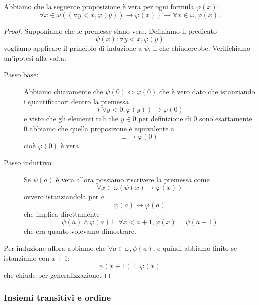 \documentclass[11pt]{scrartcl}
\begin{document}
 	\begin{proposition}
 		Abbiamo che la seguente proposizione è vera per ogni formula $\varphi(x)$:
 		$$\forall x\in \omega\left((\forall y<x,\varphi(y))\to \varphi(x)\right)\to \forall x\in \omega,\varphi(x).$$
 	\end{proposition}
 	\begin{proof}
 		Supponiamo che le premesse siano vere. 
 		Definiamo il predicato
 		$$\psi(x):\forall y< x,\varphi(y)$$
 		vogliamo applicare il principio di induzione a $\psi$, il che chiuderebbe. Verifichiamo un'ipotesi alla volta:
 		\begin{description}
 			\item[Passo base:] Abbiamo chiaramente che $\psi(0)\iff \varphi(0)$ che è vero dato che istanziando i quantificatori dentro la premessa
 			$$(\forall y<0,\varphi(y))\to \varphi(0)$$
 			e visto che gli elementi tali che $y\in 0$ per definizione di $0$ sono esattamente $0$ abbiamo che quella proposizone è equivalente a 
 			$$\bot \to \varphi(0)$$
 			cioè $\varphi(0)$ è vera. 
 			\item[Passo induttivo:] Se $\psi(a)$ è vera allora possiamo riscrivere la premessa come
 			$$\forall x\in \omega\left(\psi(x)\to \varphi(x)\right)$$
 			ovvero istanziandola per $a$ 
 			$$\psi(a)\to \varphi(a)$$
 			che implica direttamente
 			$$\psi(a)\land \varphi(a)\vdash \forall x<a+1,\varphi(x)=\psi(a+1)$$
 			che era quanto volevamo dimostrare.
 		\end{description}
 		Per induzione allora abbiamo che $\forall a\in \omega,\psi(a)$, e quindi abbiamo finito se istanziamo con $x+1$:
 		$$\psi(x+1)\vdash \varphi(x)$$
 		che chiude per generalizzazione. 
 	\end{proof}
 	\subsubsection{Insiemi transitivi e ordine}
 	
\end{document}
